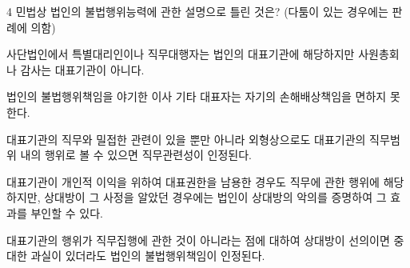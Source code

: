 \begin{question}{4}
민법상 법인의 불법행위능력에 관한 설명으로 틀린 것은? (다툼이 있는 경우에는 판례에 의함)
\begin{choices}
  \item 사단법인에서 특별대리인이나 직무대행자는 법인의 대표기관에 해당하지만 사원총회나 감사는 대표기관이 아니다.
  \item 법인의 불법행위책임을 야기한 이사 기타 대표자는 자기의 손해배상책임을 면하지 못한다.
  \item 대표기관의 직무와 밀접한 관련이 있을 뿐만 아니라 외형상으로도 대표기관의 직무범위 내의 행위로 볼 수 있으면 직무관련성이 인정된다.
  \item 대표기관이 개인적 이익을 위하여 대표권한을 남용한 경우도 직무에 관한 행위에 해당하지만, 상대방이 그 사정을 알았던 경우에는 법인이 상대방의 악의를 증명하여 그 효과를 부인할 수 있다.
  \item 대표기관의 행위가 직무집행에 관한 것이 아니라는 점에 대하여 상대방이 선의이면 중대한 과실이 있더라도 법인의 불법행위책임이 인정된다.
\end{choices}
\end{question}
